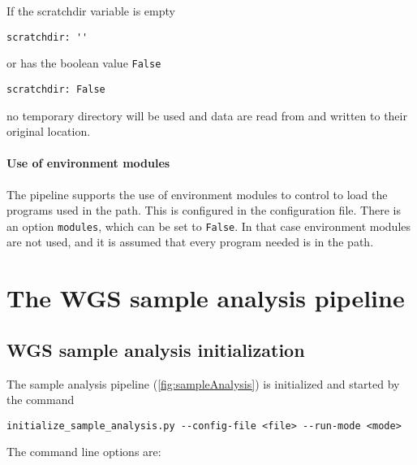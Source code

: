 \documentclass[a4paper]{article}
\begin{document}
If the scratchdir variable is empty

\begin{lstlisting}
scratchdir: ''
\end{lstlisting}

or has the boolean value \texttt{False}

\begin{lstlisting}
scratchdir: False
\end{lstlisting}

no temporary directory will be used and data are read from and written
to their original location.

\paragraph{Use of environment modules}

The pipeline supports the use of environment modules to control to
load the programs used in the path. This is configured in the
configuration file. There is an option \texttt{modules}, which can be
set to \texttt{False}. In that case environment modules are not used,
and it is assumed that every program needed is in the path.

\section{The WGS sample analysis pipeline}
\label{sec:wgs-sample-analysis}

\subsection{WGS sample analysis initialization}
\label{sec:wgs-sample-analysis-1}


The sample analysis pipeline (\cref{fig:sampleAnalysis}) is
initialized and started by the command

\begin{lstlisting}
initialize_sample_analysis.py --config-file <file> --run-mode <mode>
\end{lstlisting}

The command line options are:
\end{document}
